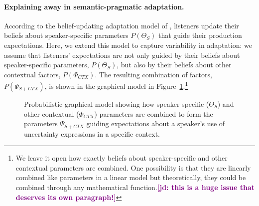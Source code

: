 \documentclass[man,floatsintext]{apa6}
\newcommand{\jd}[1]{\textcolor{Purple}{\bf [jd: #1]}}
\begin{document}
\paragraph{Explaining away in semantic-pragmatic adaptation.} According to the  belief-updating adaptation model of , listeners update their beliefs about speaker-specific parameters $P(\Theta_S)$ that guide their production expectations. Here, we extend this model to capture variability in adaptation: we assume that listeners' expectations are not only guided by their beliefs about speaker-specific parameters, $P(\Theta_S)$, but also by their beliefs about other contextual factors, $P(\Phi_{CTX})$. The resulting combination of factors, $P(\Psi_{S+CTX})$, is shown in the graphical model in Figure~\ref{fig:explaining-away-model}.\footnote{We leave it open how exactly beliefs about speaker-specific and other contextual parameters are combined. One  possibility is that they are linearly combined like parameters in a linear model but theoretically, they could be combined through any mathematical function.\jd{this is a huge issue that deserves its own paragraph!}}

\begin{figure}[t]
    \centering
    \caption{Probabilistic graphical model showing how speaker-specific ($\Theta_S$) and other contextual ($\Phi_{CTX}$) parameters are combined to form the parameters $\Psi_{S+CTX}$ guiding expectations about a speaker's use of uncertainty expressions in a specific context.}
    \label{fig:explaining-away-model}
\end{figure}
\end{document}
